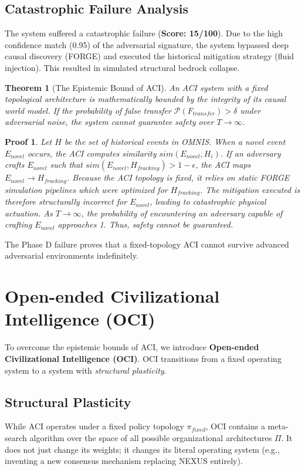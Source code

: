 \documentclass[12pt,a4paper]{article}
\newtheorem{theorem}{Theorem}
\newtheorem{proof_of_theorem}{Proof}
\begin{document}
\subsection{Catastrophic Failure Analysis}
The system suffered a catastrophic failure (\textbf{Score: 15/100}). Due to the high confidence match (0.95) of the adversarial signature, the system bypassed deep causal discovery (FORGE) and executed the historical mitigation strategy (fluid injection). This resulted in simulated structural bedrock collapse.

\begin{theorem}[The Epistemic Bound of ACI]
An ACI system with a fixed topological architecture is mathematically bounded by the integrity of its causal world model. If the probability of false transfer $\mathcal{P}(F_{transfer}) > \delta$ under adversarial noise, the system cannot guarantee safety over $T \to \infty$.
\end{theorem}

\begin{proof_of_theorem}
Let $H$ be the set of historical events in OMNIS. When a novel event $E_{novel}$ occurs, the ACI computes similarity $sim(E_{novel}, H_i)$. If an adversary crafts $E_{novel}$ such that $sim(E_{novel}, H_{fracking}) > 1 - \epsilon$, the ACI maps $E_{novel} \to H_{fracking}$. Because the ACI topology is fixed, it relies on static FORGE simulation pipelines which were optimized for $H_{fracking}$. The mitigation executed is therefore structurally incorrect for $E_{novel}$, leading to catastrophic physical actuation. As $T \to \infty$, the probability of encountering an adversary capable of crafting $E_{novel}$ approaches 1. Thus, safety cannot be guaranteed.
\end{proof_of_theorem}

The Phase D failure proves that a fixed-topology ACI cannot survive advanced adversarial environments indefinitely.

\section{Open-ended Civilizational Intelligence (OCI)}
\label{sec:oci}
To overcome the epistemic bounds of ACI, we introduce \textbf{Open-ended Civilizational Intelligence (OCI)}. OCI transitions from a fixed operating system to a system with \textit{structural plasticity}. 

\subsection{Structural Plasticity}
While ACI operates under a fixed policy topology $\pi_{fixed}$, OCI contains a meta-search algorithm over the space of all possible organizational architectures $\Pi$. It does not just change its weights; it changes its literal operating system (e.g., inventing a new consensus mechanism replacing NEXUS entirely).
\end{document}
